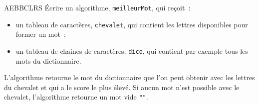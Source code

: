 \begin{Exercice}{AEBBCLRS}
			\'Ecrire un algorithme, \texttt{meilleurMot}, qui reçoit~:
			\begin{itemize}
			\item un tableau de caractères, \texttt{chevalet}, qui contient les lettres disponibles pour former un mot~;
			\item un tableau de chaines de caractères, \texttt{dico}, qui contient par exemple tous les mots du dictionnaire.
			\end{itemize}
			L’algorithme retourne le mot du dictionnaire que l’on peut obtenir avec les lettres du chevalet 
			et qui a le score le plus élevé. 
			Si aucun mot n’est possible avec le chevalet, l’algorithme retourne un mot vide \texttt{""}.
	
		\end{Exercice}



